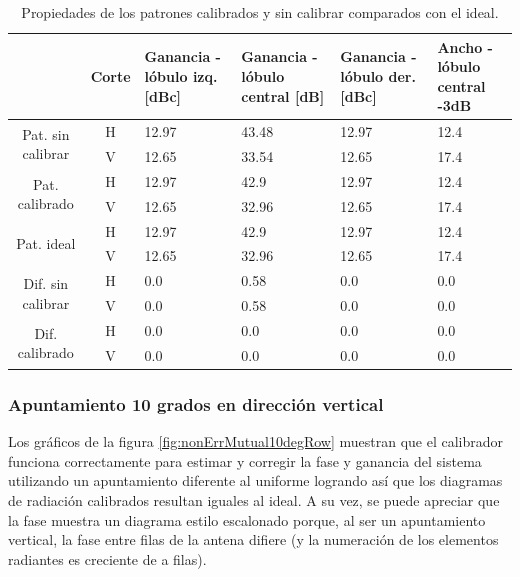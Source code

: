 \begin{table}[H]
  \footnotesize
  \centering
  \begin{tabular}{|c|c|p{2cm}|p{2.5cm}|p{2.5cm}|p{2.5cm}|}
    \cline{2-6}
    \multicolumn{1}{c|}{} & Corte & Ganancia - lóbulo izq. [dBc] & Ganancia - lóbulo central [dB] &
    Ganancia - lóbulo der. [dBc] & Ancho - lóbulo central -3dB \tabularnewline\hline
    \multirow{2}{2cm}{Pat. sin calibrar} & H & 12.97 & 43.48 & 12.97 & 12.4 \tabularnewline\cline{2-6}
     & V & 12.65 & 33.54 & 12.65 & 17.4 \tabularnewline\hline
    \multirow{2}{2cm}{Pat. calibrado} & H & 12.97 & 42.9 & 12.97 & 12.4 \tabularnewline\cline{2-6}
     & V & 12.65 & 32.96 & 12.65 & 17.4 \tabularnewline\hline
    \multirow{2}{2cm}{Pat. ideal} & H & 12.97 & 42.9 & 12.97 & 12.4 \tabularnewline\cline{2-6}
     & V & 12.65 & 32.96 & 12.65 & 17.4 \tabularnewline\hline
    \multirow{2}{2cm}{Dif. sin calibrar} & H & 0.0 & 0.58 & 0.0 & 0.0\tabularnewline\cline{2-6}
     & V & 0.0 & 0.58 & 0.0 & 0.0 \tabularnewline\hline
    \multirow{2}{2cm}{Dif. calibrado} & H & 0.0 & 0.0 & 0.0 & 0.0 \tabularnewline\cline{2-6}
     & V & 0.0 & 0.0 & 0.0 & 0.0 \tabularnewline\hline
  \end{tabular}
  \caption{Propiedades de los patrones calibrados y sin calibrar comparados con el ideal.}
  \label{tab:nonErrMutual10degCol}
\end{table}


\subsubsection{Apuntamiento 10 grados en dirección vertical}

Los gráficos de la figura \ref{fig:nonErrMutual10degRow} muestran que el calibrador funciona correctamente para estimar y 
corregir la fase y ganancia del sistema utilizando un apuntamiento diferente al uniforme logrando así que los diagramas de 
radiación calibrados resultan iguales al ideal. A su vez, se puede apreciar que la fase muestra un diagrama estilo escalonado
porque, al ser un apuntamiento vertical, la fase entre filas de la antena difiere (y la numeración de los elementos radiantes 
es creciente de a filas).

